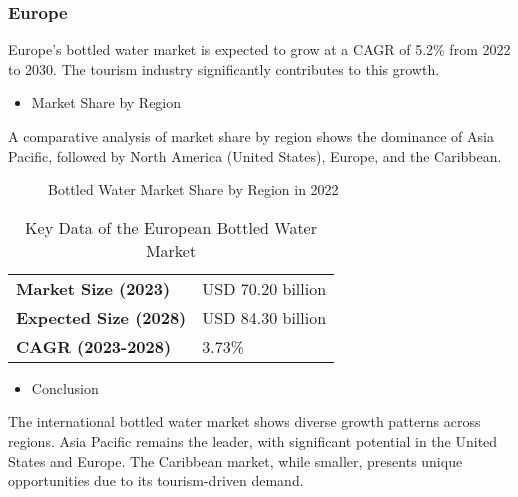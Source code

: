 \documentclass{article}
\begin{document}
\subsubsection{Europe}

Europe's bottled water market is expected to grow at a CAGR of 5.2\% from 2022 to 2030. The tourism industry significantly contributes to this growth.
\begin{itemize}
    \item Market Share by Region
\end{itemize}
A comparative analysis of market share by region shows the dominance of Asia Pacific, followed by North America (United States), Europe, and the Caribbean.

\begin{figure}[H]
\centering
{}
\caption{Bottled Water Market Share by Region in 2022}
\end{figure}

\begin{table}[H]
\centering
\begin{tabular}{|l|l|}
\hline
\textbf{Market Size (2023)} & USD 70.20 billion \\
\textbf{Expected Size (2028)} & USD 84.30 billion \\
\textbf{CAGR (2023-2028)} & 3.73\% \\
\hline
\end{tabular}
\caption{Key Data of the European Bottled Water Market}
\end{table}

\begin{itemize}
    \item Conclusion
\end{itemize}
The international bottled water market shows diverse growth patterns across regions. Asia Pacific remains the leader, with significant potential in the United States and Europe. The Caribbean market, while smaller, presents unique opportunities due to its tourism-driven demand.
\end{document}
